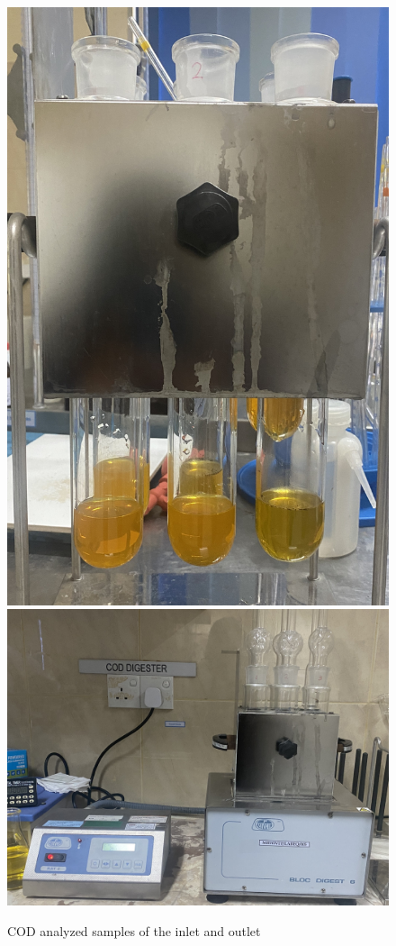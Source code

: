 \begin{figure}[H]
\centering

\includegraphics[width=.3\textwidth]{results/cod_samples.JPG}\hfill
\includegraphics[width=.6\textwidth]{results/cod_digester.JPG}\hfill

\caption{\ac{COD} analyzed samples of the inlet and outlet}
\label{fig: cod_analyzed_sample}
\end{figure}